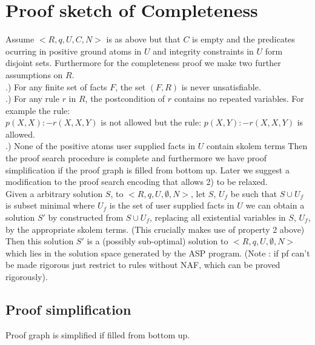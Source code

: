 \documentclass{article}
\begin{document}
\section{Proof sketch of Completeness}
Assume $<R,q,U,C,N>$ is as above but that $C$ is empty and the predicates ocurring in positive ground atoms in $U$ and integrity constraints in $U$ form disjoint sets. Furthermore for the completeness proof we make two further assumptions on $R$.\\
.) For any finite set of facts $F$, the set $(F,R)$ is never unsatisfiable.\\
.) For any rule $r$ in $R$, the postcondition of $r$ contains no repeated variables. For example the rule:\\
$p(X,X):-r(X,X,Y)$ is not allowed but the rule: $p(X,Y):-r(X,X,Y)$ is allowed.\\
.) None of the positive atoms user supplied facts in $U$ contain skolem terms
\newline
Then the proof search procedure is complete and furthermore we have proof simplification if the proof graph is filled from bottom up. Later we suggest a modification to the proof search encoding that allows 2) to be relaxed.\\
\newline
Given a arbitrary solution $S$, to $<R,q,U,\emptyset,N>$, let $S$, $U_{f}$ be such that $S\cup U_{f}$ is subset minimal where $U_{f}$ is the set of user supplied facts in $U$ we can obtain a solution $S'$ by constructed from $S\cup U_{f}$, replacing all existential variables in $S$, $U_{f}$, by the appropriate skolem terms. (This crucially makes use of property 2 above) Then this solution $S'$ is a (possibly sub-optimal) solution to $<R,q,U,\emptyset,N>$ which lies in the solution space generated by the ASP program.  (Note : if pf can't be made rigorous just restrict to rules without NAF, which can be proved rigorously).
\subsection{Proof simplification}
Proof graph is simplified if filled from bottom up.
\end{document}
